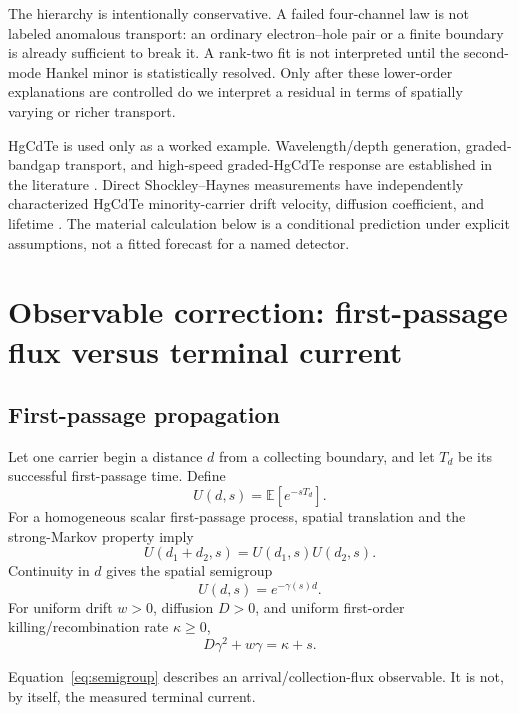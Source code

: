 \documentclass[11pt]{article}
\newcommand{\E}{\mathbb{E}}
\begin{document}
The hierarchy is intentionally conservative. A failed four-channel law is not labeled anomalous transport: an ordinary electron--hole pair or a finite boundary is already sufficient to break it. A rank-two fit is not interpreted until the second-mode Hankel minor is statistically resolved. Only after these lower-order explanations are controlled do we interpret a residual in terms of spatially varying or richer transport.

HgCdTe is used only as a worked example. Wavelength/depth generation, graded-bandgap transport, and high-speed graded-HgCdTe response are established in the literature \cite{Sang2022}. Direct Shockley--Haynes measurements have independently characterized HgCdTe minority-carrier drift velocity, diffusion coefficient, and lifetime \cite{Rothman2010}. The material calculation below is a conditional prediction under explicit assumptions, not a fitted forecast for a named detector.

\section{Observable correction: first-passage flux versus terminal current}

\subsection{First-passage propagation}

Let one carrier begin a distance $d$ from a collecting boundary, and let $T_d$ be its successful first-passage time. Define
\begin{equation}
U(d,s)=\E[e^{-sT_d}].
\label{eq:Udef}
\end{equation}
For a homogeneous scalar first-passage process, spatial translation and the strong-Markov property imply
\begin{equation}
U(d_1+d_2,s)=U(d_1,s)U(d_2,s).
\end{equation}
Continuity in $d$ gives the spatial semigroup
\begin{equation}
\boxed{U(d,s)=e^{-\gamma(s)d}.}
\label{eq:semigroup}
\end{equation}
For uniform drift $w>0$, diffusion $D>0$, and uniform first-order killing/recombination rate $\kappa\ge 0$,
\begin{equation}
\boxed{D\gamma^2+w\gamma=\kappa+s.}
\label{eq:dispersion}
\end{equation}

Equation~\eqref{eq:semigroup} describes an arrival/collection-flux observable. It is not, by itself, the measured terminal current.
\end{document}
